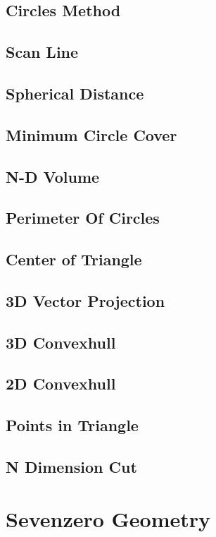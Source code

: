 \documentclass[a4paper,5pt,twocolumn,titlepage]{article}
\begin{document}
\begin{CJK*}{GBK}{song}
\subsection{Circles Method}

\subsection{Scan Line}

\subsection{Spherical Distance}

\subsection{Minimum Circle Cover}

\subsection{N-D Volume}

\subsection{Perimeter Of Circles}

\subsection{Center of Triangle}

\subsection{3D Vector Projection}

\subsection{3D Convexhull}

\subsection{2D Convexhull}

\subsection{Points in Triangle}

\subsection{N Dimension Cut}

\section{Sevenzero Geometry}

\end{CJK*}
\end{document}

